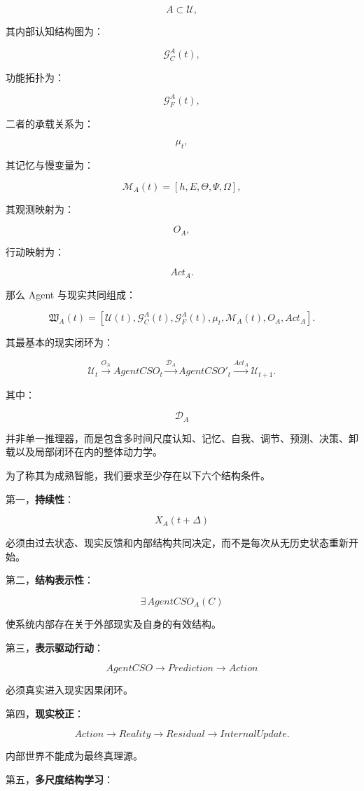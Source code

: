\[
A\subset\mathcal U,
\]

其内部认知结构图为：

\[
\mathcal G_C^A(t),
\]

功能拓扑为：

\[
\mathcal G_F^A(t),
\]

二者的承载关系为：

\[
\mu_t,
\]

其记忆与慢变量为：

\[
\mathcal M_A(t)
=
[h,E,\Theta,\Psi,\Omega],
\]

其观测映射为：

\[
O_A,
\]

行动映射为：

\[
Act_A.
\]

那么 Agent 与现实共同组成：

\[
\boxed{
\mathfrak W_A(t)
=
[
\mathcal U(t),
\mathcal G_C^A(t),
\mathcal G_F^A(t),
\mu_t,
\mathcal M_A(t),
O_A,
Act_A
].
}
\]

其最基本的现实闭环为：

\[
\mathcal U_t
\xrightarrow{O_A}
AgentCSO_t
\xrightarrow{\mathcal D_A}
AgentCSO'_t
\xrightarrow{Act_A}
\mathcal U_{t+1}.
\]

其中：

\[
\mathcal D_A
\]

并非单一推理器，而是包含多时间尺度认知、记忆、自我、调节、预测、决策、卸载以及局部闭环在内的整体动力学。

为了称其为成熟智能，我们要求至少存在以下六个结构条件。

第一，\textbf{持续性}：

\[
X_A(t+\Delta)
\]

必须由过去状态、现实反馈和内部结构共同决定，而不是每次从无历史状态重新开始。

第二，\textbf{结构表示性}：

\[
\exists\,
AgentCSO_A(C)
\]

使系统内部存在关于外部现实及自身的有效结构。

第三，\textbf{表示驱动行动}：

\[
AgentCSO
\rightarrow
Prediction
\rightarrow
Action
\]

必须真实进入现实因果闭环。

第四，\textbf{现实校正}：

\[
Action
\rightarrow
Reality
\rightarrow
Residual
\rightarrow
InternalUpdate.
\]

内部世界不能成为最终真理源。

第五，\textbf{多尺度结构学习}：

